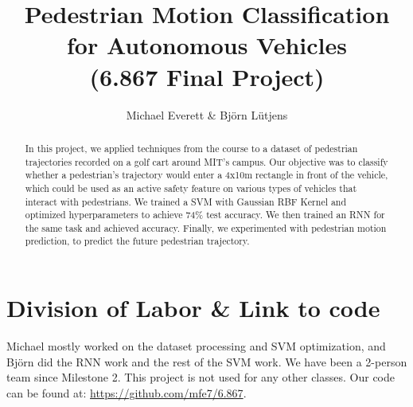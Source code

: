 \documentclass[letterpaper, 10 pt, conference]{ieeeconf}
\title{\LARGE \bf Pedestrian Motion Classification for Autonomous Vehicles\\(6.867 Final Project)}
\author{Michael Everett \& Bj{\"o}rn L{\"u}tjens}
\newcommand{\meXX}[1]{\added[id=me,remark={}]{#1}}
\begin{document}
\maketitle
\thispagestyle{empty} \pagestyle{empty}


\begin{abstract}
In this project, we applied techniques from the course to a dataset of pedestrian trajectories recorded on a golf cart around MIT's campus.
Our objective was to classify whether a pedestrian's trajectory would enter a 4x10m rectangle in front of the vehicle, which could be used as an active safety feature on various types of vehicles that interact with pedestrians.
We trained a SVM with Gaussian RBF Kernel and optimized hyperparameters to achieve 74\% test accuracy.
We then trained an RNN for the same task and achieved \meXX{RNN accuracy?} accuracy.
Finally, we experimented with pedestrian motion prediction, to predict the future pedestrian trajectory.
\end{abstract}















\section*{Division of Labor \& Link to code}
Michael mostly worked on the dataset processing and SVM optimization, and Bj{\"o}rn did the RNN work and the rest of the SVM work.
We have been a 2-person team since Milestone 2.
This project is not used for any other classes.
Our code can be found at: \url{https://github.com/mfe7/6.867}.
\balance
 
%  

\end{document}
